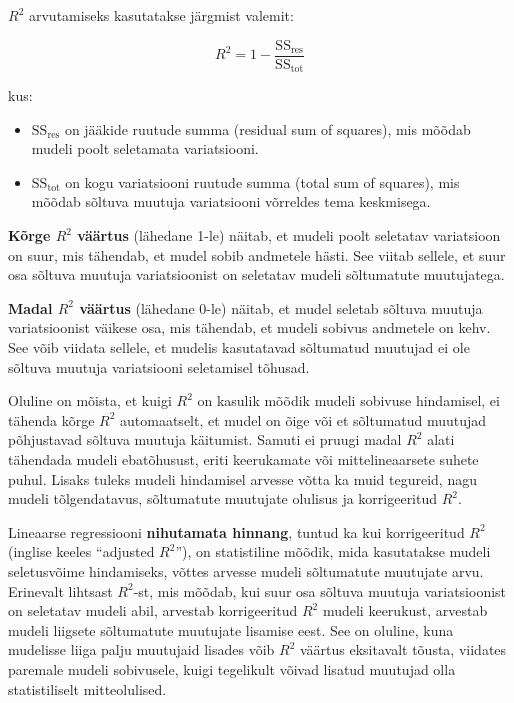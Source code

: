 \documentclass[
]{book}
\providecommand{\tightlist}{%
  \setlength{\itemsep}{0pt}\setlength{\parskip}{0pt}}
\begin{document}
\(R^2\) arvutamiseks kasutatakse järgmist valemit:

\[ R^2 = 1 - \frac{\text{SS}_\text{res}}{\text{SS}_\text{tot}} \]

kus:

\begin{itemize}
\tightlist
\item
  \(\text{SS}_\text{res}\) on jääkide ruutude summa (residual sum of squares), mis mõõdab mudeli poolt seletamata variatsiooni.
\item
  \(\text{SS}_\text{tot}\) on kogu variatsiooni ruutude summa (total sum of squares), mis mõõdab sõltuva muutuja variatsiooni võrreldes tema keskmisega.
\end{itemize}

\textbf{Kõrge \(R^2\) väärtus} (lähedane 1-le) näitab, et mudeli poolt seletatav variatsioon on suur, mis tähendab, et mudel sobib andmetele hästi. See viitab sellele, et suur osa sõltuva muutuja variatsioonist on seletatav mudeli sõltumatute muutujatega.

\textbf{Madal \(R^2\) väärtus} (lähedane 0-le) näitab, et mudel seletab sõltuva muutuja variatsioonist väikese osa, mis tähendab, et mudeli sobivus andmetele on kehv. See võib viidata sellele, et mudelis kasutatavad sõltumatud muutujad ei ole sõltuva muutuja variatsiooni seletamisel tõhusad.

Oluline on mõista, et kuigi \(R^2\) on kasulik mõõdik mudeli sobivuse hindamisel, ei tähenda kõrge \(R^2\) automaatselt, et mudel on õige või et sõltumatud muutujad põhjustavad sõltuva muutuja käitumist. Samuti ei pruugi madal \(R^2\) alati tähendada mudeli ebatõhusust, eriti keerukamate või mittelineaarsete suhete puhul. Lisaks tuleks mudeli hindamisel arvesse võtta ka muid tegureid, nagu mudeli tõlgendatavus, sõltumatute muutujate olulisus ja korrigeeritud \(R^2\).

Lineaarse regressiooni \textbf{nihutamata hinnang}, tuntud ka kui korrigeeritud \(R^2\) (inglise keeles ``adjusted \(R^2\)''), on statistiline mõõdik, mida kasutatakse mudeli seletusvõime hindamiseks, võttes arvesse mudeli sõltumatute muutujate arvu. Erinevalt lihtsast \(R^2\)-st, mis mõõdab, kui suur osa sõltuva muutuja variatsioonist on seletatav mudeli abil, arvestab korrigeeritud \(R^2\) mudeli keerukust, arvestab mudeli liigsete sõltumatute muutujate lisamise eest. See on oluline, kuna mudelisse liiga palju muutujaid lisades võib \(R^2\) väärtus eksitavalt tõusta, viidates paremale mudeli sobivusele, kuigi tegelikult võivad lisatud muutujad olla statistiliselt mitteolulised.
\end{document}
